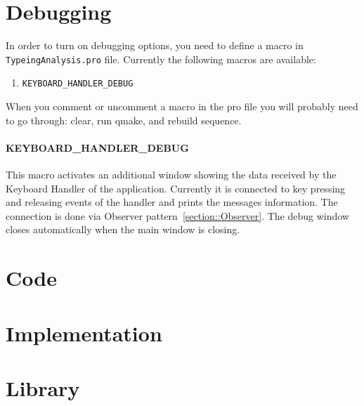 \documentclass{article}
\begin{document}
\section{Debugging}\label{section::Debugging}

In order to turn on debugging options, you need to define a macro in \verb"TypeingAnalysis.pro" file. Currently the following macros are available:
\begin{enumerate}
\item \verb"KEYBOARD_HANDLER_DEBUG"
\end{enumerate}

When you comment or uncomment a macro in the pro file you will probably need to go through: clear, run qmake, and rebuild sequence.

\paragraph{KEYBOARD\_HANDLER\_DEBUG}

This macro activates an additional window showing the data received by the Keyboard Handler of the application. Currently it is connected to key pressing and releasing events of the handler and prints the messages information. The connection is done via Observer pattern~\ref{section::Observer}. The debug window closes automatically when the main window is closing.

\section{Code}

\section{Implementation}

\section{Library}
\end{document}
